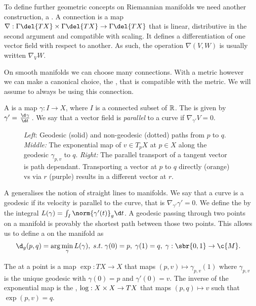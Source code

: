To define further geometric concepts on Riemannian manifolds we need another construction, a .
A connection is a map \(\nabla: \Gamma\del{TX} \x \Gamma\del{TX} \to \Gamma\del{TX}\) that is linear, distributive in the second argument and compatible with scaling. It defines a differentiation of one vector field with respect to another.
As such, the operation \(\nabla(V, W)\) is usually written \(\nabla_V W\).

On smooth manifolds we can choose many connections. 
With a metric however we can make a canonical choice, the , that is compatible with the metric.
We will assume to always be using this connection.

A  is a map \(\gamma: I \to X\), where \(I\) is a connected subset of \(\mathbb{R}\).
The  is given by \(\gamma' = {\od{\gamma}{t}}\).
We say that a vector field is \emph{parallel} to a curve if \(\nabla_{\gamma'}V = 0\).

\begin{figure}[h]
	
	\hfill
	
	\hfill
	
	\caption{\emph{Left}: Geodesic (solid) and non-geodesic (dotted) paths from \(p\) to \(q\). \emph{Middle:} The exponential map of \(v\in T_pX\) at \(p\in X\) along the geodesic \(\gamma_{p, v}\) to \(q\). \emph{Right:} The parallel transport of a tangent vector is path dependant. Transporting a vector at \(p\) to \(q\) directly (orange) vs via \(r\) (purple) results in a different vector at \(r\).}
\end{figure}

A  generalises the notion of straight lines to manifolds.
We say that a curve is a geodesic if its velocity is parallel to the curve, that is \(\nabla_{\gamma'} \gamma' = 0\).
We define the  by the integral \(L(\gamma) = \int_I \norm{\gamma'(t)}_g \d t\).
A geodesic passing through two points on a manifold is provably the shortest path between those two points.
This allows us to define a  on the manifold as \[\d_g(p, q) = \arg\min_{\gamma} L(\gamma), \; s.t. \; \gamma(0) = p, \; \gamma(1) = q, \; \gamma:\sbr{0, 1} \to \c{M}.\]

The  at a point is a map \(\exp: TX \to X\) that maps \((p, v) \mapsto \gamma_{p,v}(1)\) where \(\gamma_{p,v}\) is the unique geodesic with \(\gamma(0) = p\) and \(\gamma'(0) = v\).
The inverse of the exponential map is the , \(\log: X \times X \to TX\) that maps \((p, q) \mapsto v\) such that \(\exp(p, v) = q\).


